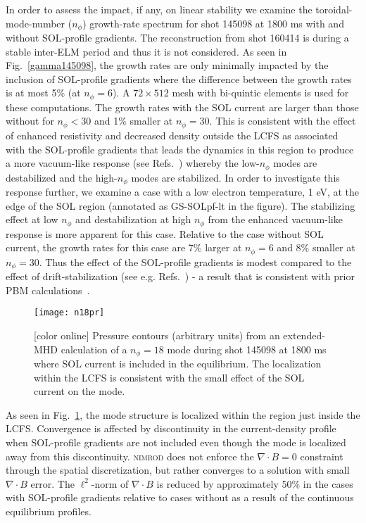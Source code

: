\documentclass[english,aps,superscriptaddress,showkeys,showpacs,prepri,twocolumn]{revtex4}
\begin{document}
In order to assess the impact, if any, on linear stability we examine the
toroidal-mode-number ($n_\phi$) growth-rate spectrum for shot 145098 at 1800 ms
with and without SOL-profile gradients. The reconstruction from shot 160414 is
during a stable inter-ELM period and thus it is not considered. As seen in
Fig.~\ref{gamma145098}, the growth rates are only minimally impacted by the 
inclusion of SOL-profile gradients where the
difference between the growth rates is at most 5\% (at $n_\phi=6$).  A
$72\times512$ mesh with bi-quintic elements is used for these computations.  The
growth rates with the SOL current are larger than those without for
$n_\phi<30$ and 1\% smaller at $n_\phi=30$. This is consistent with the effect
of enhanced resistivity and decreased density outside the LCFS as associated with
the SOL-profile gradients that leads the dynamics in this region to produce a
more vacuum-like response (see Refs.~\cite{Burke10,Ferraro10}) whereby
the low-$n_\phi$ modes are destabilized and the high-$n_\phi$ modes are
stabilized.  In order to
investigate this response further, we examine a case with a low electron
temperature, 1 eV, at the edge of the SOL region (annotated as GS-SOLpf-lt in
the figure). The stabilizing effect at low $n_\phi$ and destabilization at
high $n_\phi$ from the enhanced vacuum-like response is more apparent for this case.
Relative to the case without SOL current, the growth rates for this 
case are 7\% larger at $n_\phi=6$ and 8\% smaller at $n_\phi=30$. Thus the effect
of the SOL-profile gradients is modest compared to the effect of drift-stabilization 
(see e.g. Refs.~\cite{King16m,King14}) - a result that is consistent with prior 
PBM calculations~\cite{Snyder02}.

\begin{figure}
\begin{center}
\texttt{[image: n18pr]}
\caption{ [color online]
Pressure contours (arbitrary units) from an extended-MHD calculation of a
$n_{\phi}=18$ mode during shot 145098 at 1800 ms where SOL
current is included in the equilibrium. The localization within the LCFS
is consistent with the small effect of the SOL current on the mode.
}
\label{pr145098}
\end{center}
\end{figure}

As seen in Fig.~\ref{pr145098}, the mode structure is localized within the
region just inside the LCFS. Convergence is affected by discontinuity in the
current-density profile when SOL-profile gradients are not included 
even though the mode is localized away from this discontinuity.
\textsc{nimrod} does not enforce the $\nabla \cdot B=0$ constraint through the
spatial discretization, but rather converges to a solution with small $\nabla
\cdot B$ error.  The $\ell^2$-norm of $\nabla \cdot B$ is reduced by
approximately 50\% in the cases with SOL-profile gradients relative to cases
without as a result of the continuous equilibrium profiles.
\end{document}
